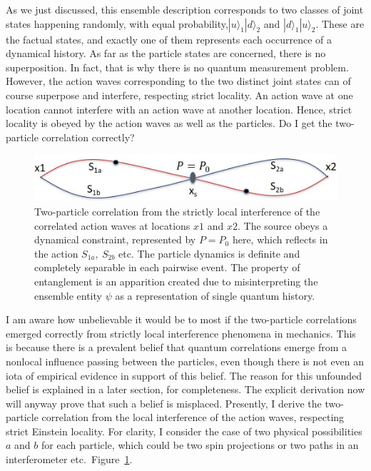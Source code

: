 As we just discussed, this ensemble description corresponds to two classes of joint states
happening randomly, with equal probability,\break $|u \rangle_1 |d \rangle_2$ and $|d \rangle_1 |u \rangle_2$. These are the factual
states, and exactly one of them represents each occurrence of a dynamical history. As far
as the particle states are concerned, there is no superposition. In fact, that is why there
is no quantum measurement problem. However, the action waves corresponding to the two
distinct joint states can of course superpose and interfere, respecting strict locality. An
action wave at one location cannot interfere with an action wave at another location. Hence,
strict locality is obeyed by the action waves as well as the particles. Do I get the two-particle
correlation correctly?
\bigskip

\begin{figure}[tb]
\centering
\includegraphics[scale=0.6]{src/images/chap27/3.jpg}
\smallskip

\caption{Two-particle correlation from the strictly local interference of the correlated action waves at
locations $x1$ and $x2$. The source obeys a dynamical constraint, represented by $P = P_0$ here, which
reflects in the action $S_{1a}, ~S_{2b}$ etc. The particle dynamics is definite and completely separable in
each pairwise event. The property of entanglement is an apparition created due to misinterpreting
the ensemble entity $\psi$ as a representation of single quantum history.}\label{ch14-fig3}
\end{figure}

I am aware how unbelievable it would be to most if the two-particle correlations emerged
correctly from strictly local interference phenomena in mechanics. This is because there is a
prevalent belief that quantum correlations emerge from a nonlocal influence passing between
the particles, even though there is not even an iota of empirical evidence in support of this
belief. The reason for this unfounded belief is explained in a later section, for completeness.
The explicit derivation now will anyway prove that such a belief is misplaced. Presently, I
derive the two-particle correlation from the local interference of the action waves, respecting
strict Einstein locality. For clarity, I consider the case of two physical possibilities $a$ and $b$
for each particle, which could be two spin projections or two paths in an interferometer etc.\ Figure~\ref{ch14-fig3}.

